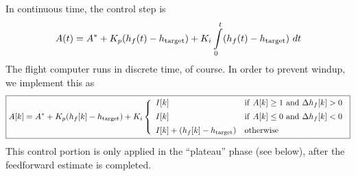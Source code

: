 \documentclass{amsdtx}
\begin{document}
In continuous time, the control step is
\begin{align}
	A(t) = A^* + K_p(h_f(t)-h_{\rm target}) + K_i\int\limits_0^t (h_f(t)-h_{\rm target})~dt
\end{align}
The flight computer runs in discrete time, of course. In order to prevent windup, we implement this as
\begin{align}
	\boxed{A[k] = A^* + K_p(h_f[k]-h_{\rm target}) + K_i\left\{\begin{array}{ll}
I[k] & {\rm if~}	A[k]\geq 1{\rm~and~}\Delta h_f[k]>0 \\[.5em]
I[k]  & {\rm if~}A[k]\leq 0{\rm~and~}\Delta h_f[k]<0\\[.5em]
 I[k] + (h_f[k]-h_{\rm target}) & \rm otherwise
\end{array}
\right.}
\end{align}
This control portion is only applied in the ``plateau'' phase (see below), after the feedforward estimate is completed.
\end{document}
